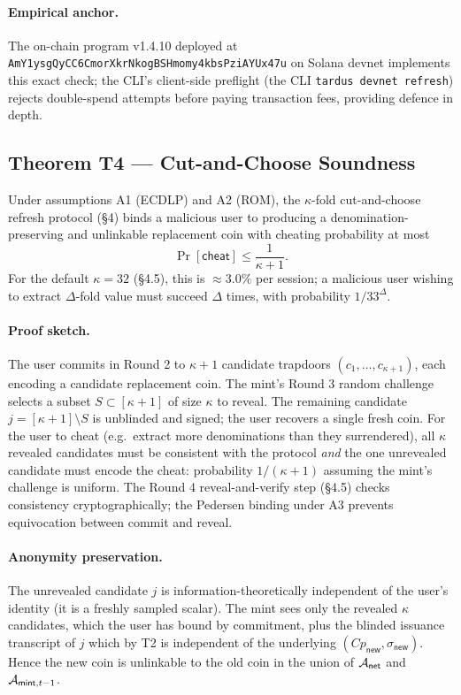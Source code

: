\paragraph{Empirical anchor.} The on-chain program v1.4.10 deployed at
\texttt{AmY1ysgQyCC6CmorXkrNkogBSHmomy4kbsPziAYUx47u} on Solana devnet
implements this exact check; the CLI's client-side preflight
(the CLI \texttt{tardus devnet refresh}) rejects double-spend attempts before paying
transaction fees, providing defence in depth.

\subsection{Theorem T4 --- Cut-and-Choose Soundness}
\label{sec:thm-cut-and-choose}

\begin{theorem}
\label{thm:cut-and-choose}
Under assumptions A1 (ECDLP) and A2 (ROM), the $\kappa$-fold
cut-and-choose refresh protocol (\S4) binds a malicious
user to producing a denomination-preserving and unlinkable replacement coin
with cheating probability at most
\[
  \Pr[\mathsf{cheat}] \leq \frac{1}{\kappa + 1}.
\]
For the default $\kappa = 32$ (\S4.5), this is
$\approx 3.0\%$ per session; a malicious user wishing to extract
$\Delta$-fold value must succeed $\Delta$ times, with probability
$1 / 33^\Delta$.
\end{theorem}

\paragraph{Proof sketch.} The user commits in Round 2 to $\kappa + 1$
candidate trapdoors $(c_1, \ldots, c_{\kappa+1})$, each encoding a
candidate replacement coin. The mint's Round 3 random challenge selects a
subset $S \subset [\kappa+1]$ of size $\kappa$ to reveal. The remaining
candidate $j = [\kappa+1] \setminus S$ is unblinded and signed; the user
recovers a single fresh coin. For the user to cheat (e.g.\ extract more
denominations than they surrendered), all $\kappa$ revealed candidates
must be consistent with the protocol \emph{and} the one unrevealed
candidate must encode the cheat: probability $1/(\kappa+1)$ assuming the
mint's challenge is uniform. The Round 4 reveal-and-verify step
(\S4.5) checks consistency cryptographically; the
Pedersen binding under A3 prevents equivocation between commit and reveal.

\paragraph{Anonymity preservation.} The unrevealed candidate $j$ is
information-theoretically independent of the user's identity (it is a
freshly sampled scalar). The mint sees only the revealed $\kappa$
candidates, which the user has bound by commitment, plus the blinded
issuance transcript of $j$ which by T2 is independent of the underlying
$(Cp_{\mathsf{new}}, \sigma_{\mathsf{new}})$. Hence the new coin is
unlinkable to the old coin in the union of $\mathcal{A}_{\mathsf{net}}$ and
$\mathcal{A}_{\mathsf{mint},t-1}$.

